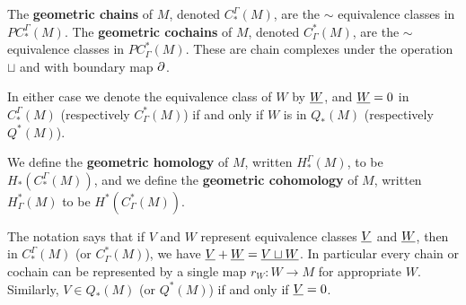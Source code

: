 \begin{definition}
The \textbf{geometric chains} of $M$, denoted $C^\Gamma_*(M)$, are the $\sim$ equivalence classes in $PC^\Gamma_*(M)$.
The \textbf{geometric cochains} of $M$, denoted $C_\Gamma^*(M)$, are the $\sim$ equivalence classes in $PC_\Gamma^*(M)$.
These are chain complexes under the operation $\sqcup$ and with boundary map $\partial$.

In either case we denote the equivalence class of $W$ by $\underline{W}$, and $\underline{W} = 0$ in $C^\Gamma_*(M)$ (respectively $C_\Gamma^*(M)$) if and only if $W$ is in $Q_*(M)$ (respectively $Q^*(M)$).

We define the \textbf{geometric homology} of $M$, written $H_*^\Gamma(M)$, to be $H_*(C^\Gamma_*(M))$, and
we define the \textbf{geometric cohomology} of $M$, written $H^*_\Gamma(M)$ to be $H^*(C_\Gamma^*(M))$.
\end{definition}

The notation says that if $V$ and $W$ represent equivalence classes $\underline{V}$ and $\underline{W}$, then in $C_*^{\Gamma}(M)$ (or $C^*_\Gamma(M)$), we have $\underline{V}+\underline{W} = \underline{V \sqcup W}$. In particular every chain or cochain can be represented by a single map $r_W \colon W \to M$ for appropriate $W$. Similarly, $V \in Q_*(M)$ (or $Q^*(M)$) if and only if $\underline{V} = 0$.

